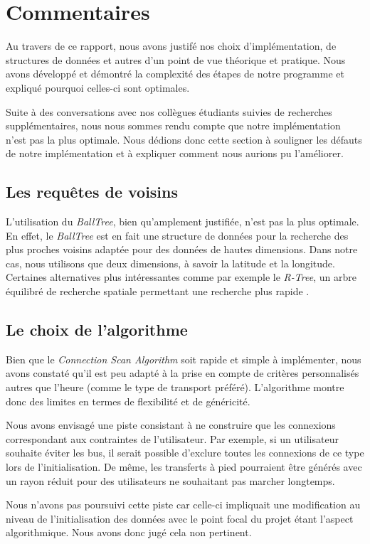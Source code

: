 \documentclass[12pt]{article}
\begin{document}
\section{Commentaires}
Au travers de ce rapport, nous avons justifé nos choix d'implémentation, de structures de données et autres d'un point de vue théorique et pratique. Nous avons développé et démontré
la complexité des étapes de notre programme et expliqué pourquoi celles-ci sont optimales. 

Suite à des conversations avec nos collègues étudiants suivies de recherches supplémentaires, nous nous sommes rendu compte que notre implémentation n'est pas la plus optimale. Nous
dédions donc cette section à souligner les défauts de notre implémentation et à expliquer comment nous aurions pu l'améliorer.

\subsection{Les requêtes de voisins}
L'utilisation du \emph{BallTree}, bien qu'amplement justifiée, n'est pas la plus optimale. En effet, le \emph{BallTree} est en fait une structure de données pour la recherche des
plus proches voisins adaptée pour des données de hautes dimensions. Dans notre cas, nous utilisons que deux dimensions, à savoir la latitude et la longitude. Certaines
alternatives plus intéressantes comme par exemple le \emph{R-Tree}, un arbre équilibré de recherche spatiale permettant une recherche plus rapide \cite{RTreedoc}.

\subsection{Le choix de l'algorithme}
Bien que le \emph{Connection Scan Algorithm} soit rapide et simple à implémenter, nous avons constaté qu'il est peu adapté à la prise en compte de critères personnalisés autres que 
l'heure (comme le type de transport préféré). L'algorithme montre donc des limites en termes de flexibilité et de généricité.

Nous avons envisagé une piste consistant à ne construire que les connexions correspondant aux contraintes de l'utilisateur. Par exemple, si un utilisateur souhaite éviter les bus, 
il serait possible d'exclure toutes les connexions de ce type lors de l'initialisation. De même, les transferts à pied pourraient être générés avec un rayon réduit pour des utilisateurs
ne souhaitant pas marcher longtemps.

Nous n'avons pas poursuivi cette piste car celle-ci impliquait une modification au niveau de l'initialisation des données avec le point focal du projet étant l'aspect algorithmique.
Nous avons donc jugé cela non pertinent.
\end{document}

